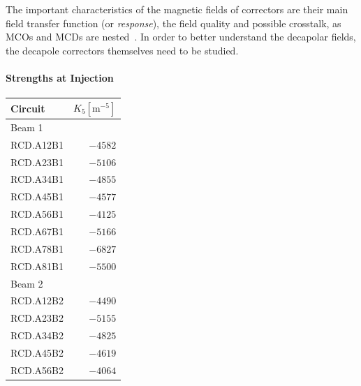 The important characteristics of the magnetic fields of correctors are their main field transfer
function (or \textit{response}), the field quality and possible crosstalk, as MCOs and MCDs are
nested~\cite{venturini_delsolaro_magnetic_2005}.
In order to better understand the decapolar fields, the decapole correctors themselves need to be
studied.


\paragraph{Strengths at Injection}

\begin{table}
    \centering
    \begin{tabular}{lr}
        \toprule
        Circuit   & $K_5 [\textrm{m}^{-5}]$ \\
        \midrule
        Beam 1    & \\
        \hspace{2mm}RCD.A12B1 & $-4582$ \\
        \hspace{2mm}RCD.A23B1 & $-5106$ \\
        \hspace{2mm}RCD.A34B1 & $-4855$ \\
        \hspace{2mm}RCD.A45B1 & $-4577$ \\
        \hspace{2mm}RCD.A56B1 & $-4125$ \\
        \hspace{2mm}RCD.A67B1 & $-5166$ \\
        \hspace{2mm}RCD.A78B1 & $-6827$ \\
        \hspace{2mm}RCD.A81B1 & $-5500$ \\
        Beam 2    & \\
        \hspace{2mm}RCD.A12B2 & $-4490$ \\
        \hspace{2mm}RCD.A23B2 & $-5155$ \\
        \hspace{2mm}RCD.A34B2 & $-4825$ \\
        \hspace{2mm}RCD.A45B2 & $-4619$ \\
        \hspace{2mm}RCD.A56B2 & $-4064$ \\

\end{tabular}
\end{table}
